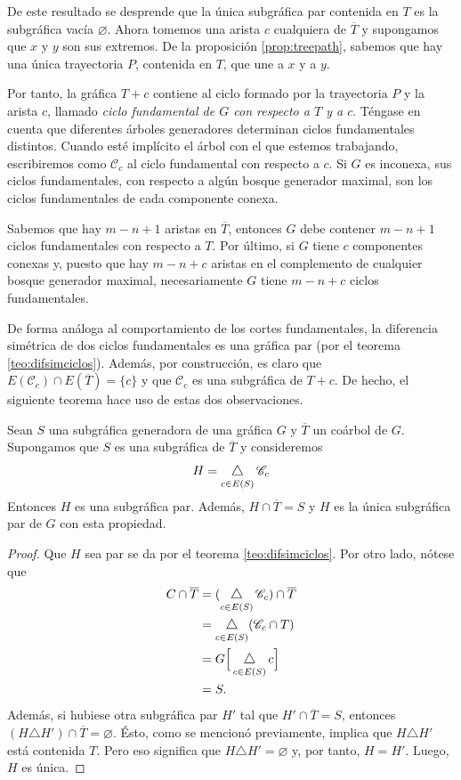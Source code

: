 De este resultado se desprende que la única subgráfica par contenida en $T$ es la subgráfica vacía $\varnothing$. Ahora tomemos una arista $c$ cualquiera  de $\overline{T}$ y supongamos que $x$ y $y$ son sus extremos. De la proposición \ref{prop:treepath}, sabemos que hay una única trayectoria $P$, contenida en $T$, que une a $x$ y a $y$. 

Por tanto, la gráfica $T + c$ contiene al ciclo formado por la trayectoria $P$ y la arista $c$, llamado \textit{ciclo fundamental de $G$ con respecto a $T$ y a $c$}. Téngase en cuenta que diferentes árboles generadores determinan ciclos fundamentales distintos. Cuando esté implícito el árbol con el que estemos trabajando, escribiremos como $\mathscr{C}_{c}$ al ciclo fundamental con respecto a $c$. Si $G$ es inconexa, sus ciclos fundamentales, con respecto a algún bosque generador maximal, son los ciclos fundamentales de cada componente conexa. 

Sabemos que hay $m - n + 1$ aristas en $\overline{T}$, entonces $G$ debe contener $m - n +1$ ciclos fundamentales con respecto a $T$.  Por último, si $G$ tiene $c$ componentes conexas y, puesto que hay $m - n + c$ aristas en el complemento de cualquier bosque generador maximal, necesariamente $G$ tiene $m-n+c$ ciclos fundamentales.

De forma análoga al comportamiento de los cortes fundamentales, la diferencia simétrica de dos ciclos fundamentales es una gráfica par (por el teorema \ref{teo:difsimciclos}). Además, por construcción, es claro que $E(\mathscr{C}_{c}) \cap E(\overline{T}) = \{c\}$ y que $\mathscr{C}_{c}$ es una subgráfica de $T + c$. De hecho, el siguiente teorema hace uso de estas dos observaciones.

\begin{lema} \label{ciclosfundamentalespropchida}
Sean $S$ una subgráfica generadora de una gráfica $G$ y $\overline{T}$ un coárbol de $G$. Supongamos que $S$ es una subgráfica de $\overline{T}$ y consideremos  
$$
H =\difsym_{c \in E(S)} \mathscr{C}_{c} 
$$
 Entonces $H$ es una subgráfica par. Además, $H \cap \overline{T} = S$ y $H$ es la única subgráfica par de $G$ con esta propiedad.
\end{lema}
 
 \begin{proof}
 Que $H$ sea par se da por el teorema \ref{teo:difsimciclos}. Por otro lado, nótese que
\begin{align*}
    C \cap \overline{T} &=(\difsym_{c \in E(S)} \mathscr{C}_{c}) \cap \overline{T} \\
             &=\difsym_{c \in E(S)} (\mathscr{C}_{c} \cap T) \\
             &=G\Big[\difsym_{c\in E(S)} c\Big] \\
             &= S.
\end{align*}
Además, si hubiese otra subgráfica par $H'$ tal que $H' \cap \overline{T}= S$, entonces $(H \triangle H') \cap \overline{T} = \varnothing$. Ésto, como se mencionó previamente, implica que  $H\triangle H' $ está contenida $T$. Pero eso significa que $H\triangle H' = \varnothing$ y, por tanto, $H = H'$. Luego, $H$ es única.
 \end{proof}

